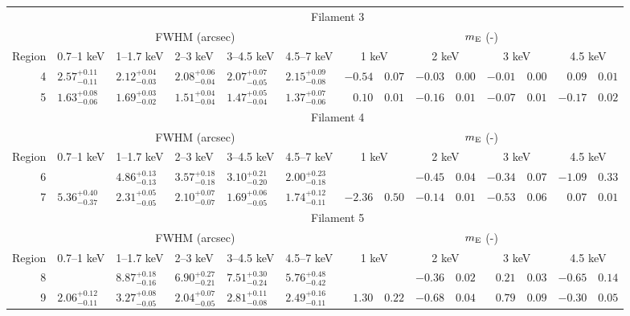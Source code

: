 \begin{tabular}{@{}rlllllr@{ $\pm$ }lr@{ $\pm$ }lr@{ $\pm$ }lr@{ $\pm$ }l@{}}
\midrule
{} & \multicolumn{13}{c}{Filament 3} \\
\cmidrule(l){2-14}
{} & \multicolumn{5}{c}{FWHM (arcsec)} & \multicolumn{8}{c}{$m_\mathrm{E}$ (-)} \\
\cmidrule(lr){2-6} \cmidrule(l){7-14}
Region & 0.7--1 keV & 1--1.7 keV & 2--3 keV & 3--4.5 keV & 4.5--7 keV
       & \multicolumn{2}{c}{1 keV} & \multicolumn{2}{c}{2 keV}
       & \multicolumn{2}{c}{3 keV} & \multicolumn{2}{c}{4.5 keV} \\
\cmidrule{1-14}
4 & ${2.57}^{+0.11}_{-0.11}$ & ${2.12}^{+0.04}_{-0.03}$ & ${2.08}^{+0.06}_{-0.04}$ & ${2.07}^{+0.07}_{-0.05}$ & ${2.15}^{+0.09}_{-0.08}$
  & $-0.54$ & $0.07$ & $-0.03$ & $0.00$ & $-0.01$ & $0.00$ & $0.09$ & $0.01$ \\
5 & ${1.63}^{+0.08}_{-0.06}$ & ${1.69}^{+0.03}_{-0.02}$ & ${1.51}^{+0.04}_{-0.04}$ & ${1.47}^{+0.05}_{-0.04}$ & ${1.37}^{+0.07}_{-0.06}$
  & $0.10$ & $0.01$ & $-0.16$ & $0.01$ & $-0.07$ & $0.01$ & $-0.17$ & $0.02$ \\

\midrule
{} & \multicolumn{13}{c}{Filament 4} \\
\cmidrule(l){2-14}
{} & \multicolumn{5}{c}{FWHM (arcsec)} & \multicolumn{8}{c}{$m_\mathrm{E}$ (-)} \\
\cmidrule(lr){2-6} \cmidrule(l){7-14}
Region & 0.7--1 keV & 1--1.7 keV & 2--3 keV & 3--4.5 keV & 4.5--7 keV
       & \multicolumn{2}{c}{1 keV} & \multicolumn{2}{c}{2 keV}
       & \multicolumn{2}{c}{3 keV} & \multicolumn{2}{c}{4.5 keV} \\
\cmidrule{1-14}
6 & {} & ${4.86}^{+0.13}_{-0.13}$ & ${3.57}^{+0.18}_{-0.18}$ & ${3.10}^{+0.21}_{-0.20}$ & ${2.00}^{+0.23}_{-0.18}$
  & \multicolumn{2}{c}{} & $-0.45$ & $0.04$ & $-0.34$ & $0.07$ & $-1.09$ & $0.33$ \\
7 & ${5.36}^{+0.40}_{-0.37}$ & ${2.31}^{+0.05}_{-0.05}$ & ${2.10}^{+0.07}_{-0.07}$ & ${1.69}^{+0.06}_{-0.05}$ & ${1.74}^{+0.12}_{-0.11}$
  & $-2.36$ & $0.50$ & $-0.14$ & $0.01$ & $-0.53$ & $0.06$ & $0.07$ & $0.01$ \\

\midrule
{} & \multicolumn{13}{c}{Filament 5} \\
\cmidrule(l){2-14}
{} & \multicolumn{5}{c}{FWHM (arcsec)} & \multicolumn{8}{c}{$m_\mathrm{E}$ (-)} \\
\cmidrule(lr){2-6} \cmidrule(l){7-14}
Region & 0.7--1 keV & 1--1.7 keV & 2--3 keV & 3--4.5 keV & 4.5--7 keV
       & \multicolumn{2}{c}{1 keV} & \multicolumn{2}{c}{2 keV}
       & \multicolumn{2}{c}{3 keV} & \multicolumn{2}{c}{4.5 keV} \\
\cmidrule{1-14}
8 & {} & ${8.87}^{+0.18}_{-0.16}$ & ${6.90}^{+0.27}_{-0.21}$ & ${7.51}^{+0.30}_{-0.24}$ & ${5.76}^{+0.48}_{-0.42}$
  & \multicolumn{2}{c}{} & $-0.36$ & $0.02$ & $0.21$ & $0.03$ & $-0.65$ & $0.14$ \\
9 & ${2.06}^{+0.12}_{-0.11}$ & ${3.27}^{+0.08}_{-0.05}$ & ${2.04}^{+0.07}_{-0.05}$ & ${2.81}^{+0.11}_{-0.08}$ & ${2.49}^{+0.16}_{-0.11}$
  & $1.30$ & $0.22$ & $-0.68$ & $0.04$ & $0.79$ & $0.09$ & $-0.30$ & $0.05$ \\


\end{tabular}
